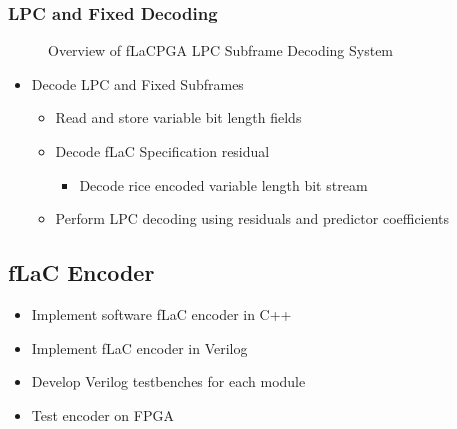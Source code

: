 \documentclass[12pt]{scrartcl}
\begin{document}
  \subsubsection{LPC and Fixed Decoding}
  \begin{figure}[H]
    \caption{Overview of fLaCPGA LPC Subframe Decoding System}
    \label{fig:LPC_overview}
  \end{figure}
  \begin{itemize}
  \item Decode LPC and Fixed Subframes
    \begin{itemize}
    \item Read and store variable bit length fields
    \item Decode fLaC Specification residual
      \begin{itemize}
      \item Decode rice encoded variable length bit stream
      \end{itemize}
    \item Perform LPC decoding using residuals and predictor coefficients
    \end {itemize}
  \end{itemize}
  
  \subsection{fLaC Encoder}
  \begin{itemize}
  \item Implement software fLaC encoder in C++
  \item Implement fLaC encoder in Verilog
  \item Develop Verilog testbenches for each module
  \item Test encoder on FPGA
  \end{itemize}
  
\end{document}
